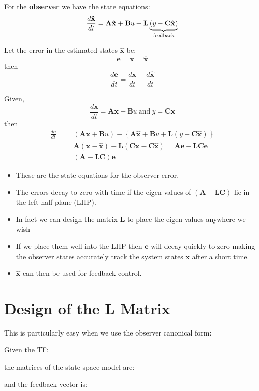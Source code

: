 For the \textbf{observer} we have the state equations:
\[
\frac{{d{\bf{\hat x}}}}{{dt}} = {\bf{A\hat x}} + {\bf{B}}u + {\bf{L}}\underbrace {(y - {\bf{C\hat x}})}_{{\rm{feedback}}}
\]

Let the error in the estimated states $\hat{\mathbf{x}}$ be:
\[
\mathbf{e}=\mathbf{x}=\hat{\mathbf{x}}
\]
then
\[
\frac{d\mathbf{e}}{dt}=\frac{d\mathbf{x}}{dt}-\frac{d\hat{\mathbf{x}}}{dt}
\]

Given,
\[
\frac{d\mathbf{x}}{dt}=\mathbf{A}\mathbf{x}+\mathbf{B}u\ \mathrm{and}\ y=\mathbf{C}\mathbf{x}
\] 
then
\begin{eqnarray*}
	\frac{d\mathbf{e}}{dt} & = & \left(\mathbf{A}\mathbf{x}+\mathbf{B}u\right)-\left\{\mathbf{A}\hat{\mathbf{x}}+\mathbf{B}u+\mathbf{L}(y-\mathbf{C}\hat{\mathbf{x}})\right\} \\
	& = & \mathbf{A}(\mathbf{x}-\hat{\mathbf{x}})-\mathbf{L}(\mathbf{C}\mathbf{x}-\mathbf{C}\hat{\mathbf{x}}) = \mathbf{Ae}-\mathbf{LCe}\\
	& = & (\mathbf{A}-\mathbf{LC})\mathbf{e}
\end{eqnarray*}
 
\begin{itemize}
	\item These are the state equations for the observer error.
	\item The errors decay to zero with time if the eigen values of  $(\mathbf{A}−\mathbf{LC})$ lie in the left half plane (LHP).
	\item In fact we can design the matrix $\mathbf{L}$ to place the eigen values anywhere we wish
	\item If we place them well into the LHP then $\mathbf{e}$ will decay quickly to zero making the observer states accurately track the system states $\mathbf{x}$ after a short time.
	\item $\hat{\mathbf{x}}$ can then be used for feedback control.
\end{itemize}

\section*{Design of the $\mathbf{L}$ Matrix} %
\label{sec:design_of_the_l_matrix}

This is particularly easy when we use the observer canonical form:

Given the TF:
 

the matrices of the state space model are:

 
and the feedback vector is:
 
